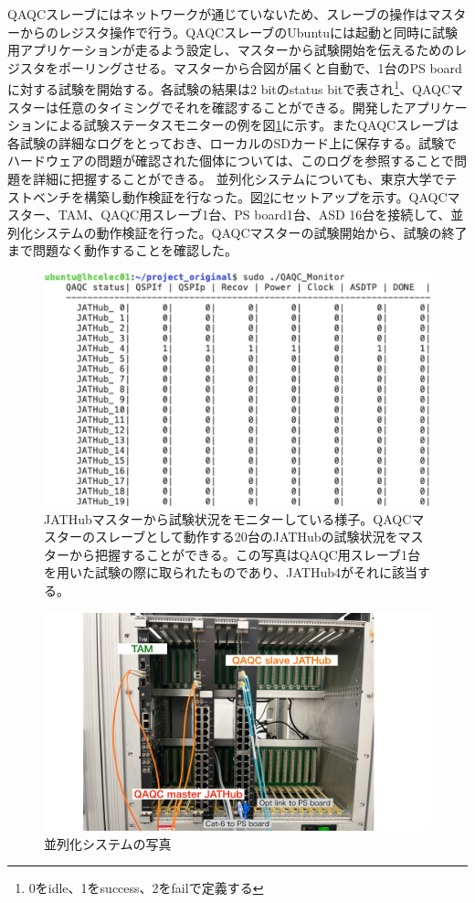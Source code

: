 QAQCスレーブにはネットワークが通じていないため、スレーブの操作はマスターからのレジスタ操作で行う。QAQCスレーブのUbuntuには起動と同時に試験用アプリケーションが走るよう設定し、マスターから試験開始を伝えるためのレジスタをポーリングさせる。マスターから合図が届くと自動で、1台のPS boardに対する試験を開始する。各試験の結果は2 bitのstatus bitで表され\footnote{0をidle、1をsuccess、2をfailで定義する}、QAQCマスターは任意のタイミングでそれを確認することができる。開発したアプリケーションによる試験ステータスモニターの例を図\ref{QAQC_monitor}に示す。またQAQCスレーブは各試験の詳細なログをとっておき、ローカルのSDカード上に保存する。試験でハードウェアの問題が確認された個体については、このログを参照することで問題を詳細に把握することができる。
並列化システムについても、東京大学でテストベンチを構築し動作検証を行なった。図\ref{QAQCpararellpicture}にセットアップを示す。QAQCマスター、TAM、QAQC用スレーブ1台、PS board1台、ASD 16台を接続して、並列化システムの動作検証を行った。QAQCマスターの試験開始から、試験の終了まで問題なく動作することを確認した。

\begin{figure} 
\centering
\includegraphics[width=12cm]{fig/QAQC/QAQC_monitor.png}
\caption[JATHubマスターからの試験状況のモニター]{JATHubマスターから試験状況をモニターしている様子。QAQCマスターのスレーブとして動作する20台のJATHubの試験状況をマスターから把握することができる。この写真はQAQC用スレーブ1台を用いた試験の際に取られたものであり、JATHub4がそれに該当する。}
\label{QAQC_monitor}
\end{figure}

\begin{figure} 
\centering
\includegraphics[width=16cm]{fig/QAQC/QAQCpararellpicture.pdf}
\caption[並列化システムの写真]{並列化システムの写真}
\label{QAQCpararellpicture}
\end{figure}

